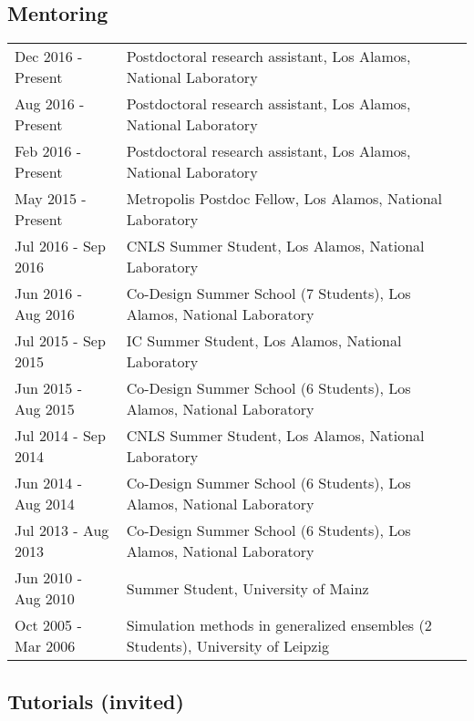 \documentclass{article}
\begin{document}
\subsection*{Mentoring}

\begin{tabular}{p{}p{}}
Dec 2016 - Present & Postdoctoral research assistant, Los Alamos, National Laboratory \\
Aug 2016 - Present & Postdoctoral research assistant, Los Alamos, National Laboratory \\
Feb 2016 - Present & Postdoctoral research assistant, Los Alamos, National Laboratory \\
May 2015 - Present & Metropolis Postdoc Fellow, Los Alamos, National Laboratory \\
Jul 2016 - Sep 2016 & CNLS Summer Student, Los Alamos, National Laboratory \\
Jun 2016 - Aug 2016 & Co-Design Summer School (7 Students), Los Alamos, National Laboratory \\
Jul 2015 - Sep 2015 & IC Summer Student, Los Alamos, National Laboratory \\
Jun 2015 - Aug 2015 & Co-Design Summer School (6 Students), Los Alamos, National Laboratory \\
Jul 2014 - Sep 2014 & CNLS Summer Student, Los Alamos, National Laboratory \\
Jun 2014 - Aug 2014 & Co-Design Summer School (6 Students), Los Alamos, National Laboratory \\
Jul 2013 - Aug 2013 & Co-Design Summer School (6 Students), Los Alamos, National Laboratory \\
Jun 2010 - Aug 2010 & Summer Student, University of Mainz \\
Oct 2005 - Mar 2006 & Simulation methods in generalized ensembles (2 Students), University of Leipzig \\
\end{tabular}

\subsection*{Tutorials (invited)}
\end{document}
